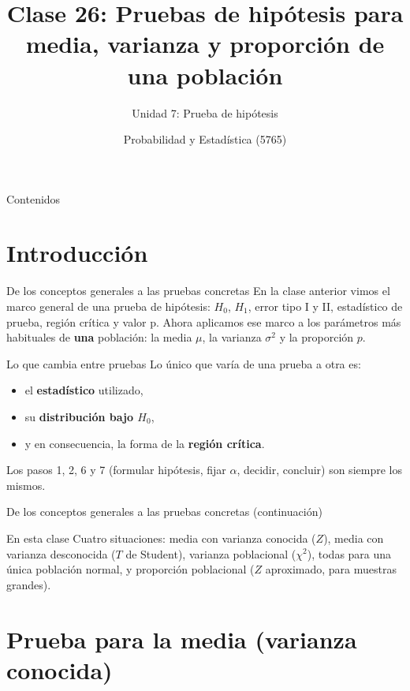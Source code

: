 \documentclass[aspectratio=169,11pt]{beamer}
\title[Prob. y Estadística]{Clase 26: Pruebas de hipótesis para media, varianza y proporción de una población}
\subtitle{Unidad 7: Prueba de hipótesis}
\institute[UNS]{Universidad Nacional del Sur \\ Departamento de Matemática}
\author{Probabilidad y Estadística (5765)}
\date{}
\begin{document}
\begin{frame}
\titlepage
\end{frame}

\begin{frame}{Contenidos}
\tableofcontents
\end{frame}

\section{Introducción}

\begin{frame}{De los conceptos generales a las pruebas concretas}
En la clase anterior vimos el marco general de una prueba de hipótesis: $H_0$, $H_1$, error tipo I y II, estadístico de prueba, región crítica y valor p. Ahora aplicamos ese marco a los parámetros más habituales de \textbf{una} población: la media $\mu$, la varianza $\sigma^2$ y la proporción $p$.

\begin{block}{Lo que cambia entre pruebas}
Lo único que varía de una prueba a otra es:
\begin{itemize}
\item el \textbf{estadístico} utilizado,
\item su \textbf{distribución bajo $H_0$},
\item y en consecuencia, la forma de la \textbf{región crítica}.
\end{itemize}
Los pasos 1, 2, 6 y 7 (formular hipótesis, fijar $\alpha$, decidir, concluir) son siempre los mismos.
\end{block}

\end{frame}

\begin{frame}{De los conceptos generales a las pruebas concretas (continuación)}
\begin{alertblock}{En esta clase}
Cuatro situaciones: media con varianza conocida ($Z$), media con varianza desconocida ($T$ de Student), varianza poblacional ($\chi^2$), todas para una única población normal, y proporción poblacional ($Z$ aproximado, para muestras grandes).
\end{alertblock}
\end{frame}

\section{Prueba para la media (varianza conocida)}
\end{document}
